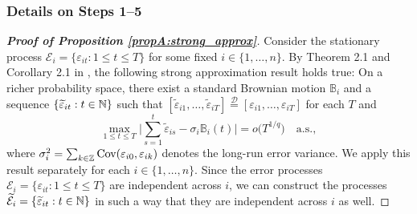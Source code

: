 \subsubsection*{Details on Steps 1--5}


\begin{proof}[\textnormal{\textbf{Proof of Proposition \ref{propA:strong_approx}}}] 
Consider the stationary process $\mathcal{E}_i = \{\varepsilon_{it}: 1 \leq t \leq T\}$ for some fixed $i \in \{1,\ldots,n\}$. By Theorem 2.1 and Corollary 2.1 in \cite{BerkesLiuWu2014}, the following strong approximation result holds true: On a richer probability space, there exist a standard Brownian motion $\mathbb{B}_i$ and a sequence $\{ \widetilde{\varepsilon}_{it}: t \in \mathbb{N} \}$ such that $[\widetilde{\varepsilon}_{i1},\ldots,\widetilde{\varepsilon}_{iT}] \stackrel{\mathcal{D}}{=} [\varepsilon_{i1},\ldots,\varepsilon_{iT}]$ for each $T$ and 
\begin{equation}\label{eq-strongapprox-dep}
\max_{1 \le t \le T} \Big| \sum\limits_{s=1}^t \widetilde{\varepsilon}_{is} - \sigma_i \mathbb{B}_i(t) \Big| = o\big( T^{1/q} \big) \quad \text{a.s.},  
\end{equation}
where $\sigma^2_i = \sum_{k \in \mathbb{Z}} \textnormal{Cov}(\varepsilon_{i0}, \varepsilon_{ik})$ denotes the long-run error variance. We apply this result separately for each $i \in \{1,\ldots,n\}$. Since the error processes $\mathcal{E}_i = \{\varepsilon_{it}: 1 \leq t \leq T\}$ are independent across $i$, we can construct the processes $\widetilde{\mathcal{E}}_i = \{\widetilde{\varepsilon}_{it}: t\in \mathbb{N}\}$ in such a way that they are independent across $i$ as well. 



\end{proof}

